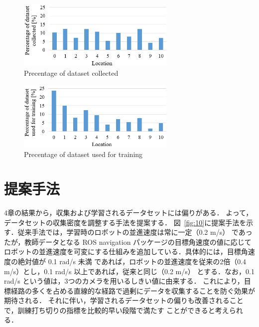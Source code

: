 \documentclass{jarticle}
\renewcommand{\figurename}{図~}
\newcommand{\figref}[1]{\figurename\ref{#1}}
\begin{document}
\begin{figure}[h!]
  \centering
   \includegraphics[height=33mm]{./png/set2.png}
   \caption{Precentage of dataset collected}
   \label{fig:8}
\end{figure}



\begin{figure}[h!]
  \centering
   \includegraphics[height=33mm]{./png/gaku2.png}
   \caption{Precentage of dataset used for training}
   \label{fig:9}
\end{figure}


\section{提案手法}
4章の結果から，収集および学習されるデータセットには偏りがある．
よって，データセットの収集密度を調整する手法を提案する．
\figref{fig:10}に提案手法を示す．従来手法では，学習時のロボットの並進速度は常に一定（0.2 m/s）
であったが，教師データとなる ROS navigation パッケージの目標角速度の値に応じて
ロボットの並進速度を可変にする仕組みを追加している．具体的には，目標角速度の絶対値が 0.1 rad/s 未満
であれば，ロボットの並進速度を従来の2倍（0.4 m/s）とし，0.1 rad/s 以上であれば，従来と同じ（0.2 m/s）
とする．なお，0.1 rad/s という値は，3つのカメラを用いるしきい値に由来する．
これにより，目標経路の多くを占める直線的な経路で過剰にデータを収集することを防ぐ効果が期待される．
それに伴い，学習されるデータセットの偏りも改善されることで，訓練打ち切りの指標を比較的早い段階で満たす
ことができると考えられる．
\end{document}
